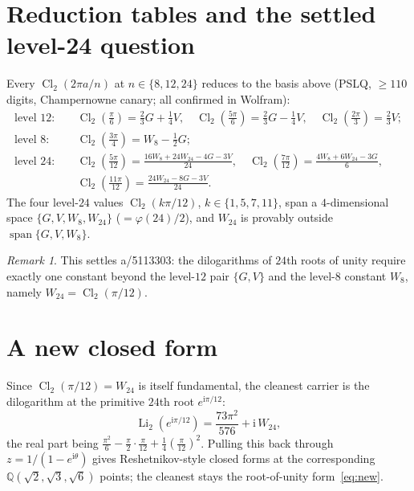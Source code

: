 \documentclass[11pt]{article}
\DeclareMathOperator{\Li}{Li}
\DeclareMathOperator{\Cl}{Cl}
\newcommand{\iu}{\mathrm{i}}
\theoremstyle{plain}\newtheorem{theorem}{Theorem}\newtheorem{proposition}[theorem]{Proposition}
\theoremstyle{remark}\newtheorem{remark}[theorem]{Remark}
\begin{document}
\section{Reduction tables and the settled level-24 question}
Every $\Cl_2(2\pi a/n)$ at $n\in\{8,12,24\}$ reduces to the basis above (PSLQ, $\ge110$ digits,
Champernowne canary; all confirmed in Wolfram):
\begin{align*}
\text{level }12:\quad
  &\Cl_2(\tfrac\pi6)=\tfrac23G+\tfrac14V,\quad \Cl_2(\tfrac{5\pi}6)=\tfrac23G-\tfrac14V,\quad
  \Cl_2(\tfrac{2\pi}3)=\tfrac23V;\\
\text{level }8:\quad
  &\Cl_2(\tfrac{3\pi}4)=W_8-\tfrac12G;\\
\text{level }24:\quad
  &\Cl_2(\tfrac{5\pi}{12})=\tfrac{16W_8+24W_{24}-4G-3V}{24},\quad
  \Cl_2(\tfrac{7\pi}{12})=\tfrac{4W_8+6W_{24}-3G}{6},\\
  &\Cl_2(\tfrac{11\pi}{12})=\tfrac{24W_{24}-8G-3V}{24}.
\end{align*}
The four level-$24$ values $\Cl_2(k\pi/12)$, $k\in\{1,5,7,11\}$, span a $4$-dimensional space
$\{G,V,W_8,W_{24}\}$ ($=\varphi(24)/2$), and $W_{24}$ is provably outside $\operatorname{span}\{G,V,W_8\}$.
\begin{remark}
This settles a/5113303: the dilogarithms of $24$th roots of unity require exactly one constant beyond the
level-$12$ pair $\{G,V\}$ and the level-$8$ constant $W_8$, namely $W_{24}=\Cl_2(\pi/12)$.
\end{remark}

\section{A new closed form}
Since $\Cl_2(\pi/12)=W_{24}$ is itself fundamental, the cleanest carrier is the dilogarithm at the
primitive $24$th root $e^{\iu\pi/12}$:
\begin{equation}\label{eq:new}
  \Li_2(e^{\iu\pi/12})=\frac{73\pi^2}{576}+\iu\,W_{24},
\end{equation}
the real part being $\tfrac{\pi^2}6-\tfrac{\pi}{2}\!\cdot\!\tfrac\pi{12}+\tfrac14(\tfrac\pi{12})^2$. Pulling
this back through $z=1/(1-e^{\iu\theta})$ gives Reshetnikov-style closed forms at the corresponding
$\mathbb Q(\sqrt2,\sqrt3,\sqrt6)$ points; the cleanest stays the root-of-unity form~\eqref{eq:new}.
\end{document}
